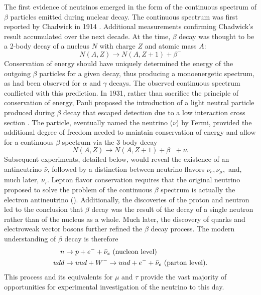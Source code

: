 The first evidence of neutrinos emerged in the form of
the continuous spectrum of $\beta$ particles
emitted during nuclear decay.
The continuous spectrum was first reported by Chadwick in 1914 \cite{chadwick_beta}.
Additional measurements confirming Chadwick's result accumulated over the next decade.
At the time, $\beta$ decay was thought to be a 2-body decay
of a nucleus $N$ with charge $Z$ and atomic mass $A$:
\begin{equation}\label{eq:old_beta}
    N(A, Z) \to N(A, Z+1) + \beta^-
\end{equation}
Conservation of energy should have uniquely determined the energy
of the outgoing $\beta$ particles for a given decay,
thus producing a monoenergetic spectrum,
as had been observed for $\alpha$ and $\gamma$ decays.
The observed continuous spectrum conflicted with this prediction.
In 1931, rather than sacrifice the principle of conservation of energy,
Pauli proposed the introduction of a light neutral particle
produced during $\beta$ decay that escaped detection
due to a low interaction cross section \cite{pauli_letter}.
The particle, eventually named the neutrino ($\nu$) by Fermi,
provided the additional degree of freedom needed
to maintain conservation of energy and allow for a continuous $\beta$ spectrum
via the 3-body decay
\begin{equation}\label{eq:beta_mid}
    N(A, Z) \to N(A, Z+1) + \beta^- + \nu.
\end{equation}
Subsequent experiments, detailed below,
would reveal the existence of an antineutrino $\bar{\nu}$,
followed by a distinction between neutrino flavors $\nu_e, \nu_\mu,$
and, much later, $\nu_\tau$.
Lepton flavor conservation requires that
the original neutrino proposed to solve
the problem of the continuous $\beta$ spectrum
is actually the electron antineutrino (\nuebar).
Additionally, the discoveries of the proton and neutron
led to the conclusion that $\beta$ decay was the result of
the decay of a single neutron rather than of the nucleus as a whole.
Much later, the discovery of quarks and electroweak vector bosons
further refined the $\beta$ decay process.
The modern understanding of $\beta$ decay is therefore
\begin{align}\label{eq:beta_modern}
    \begin{split}
        n &\to p + e^- + \bar{\nu}_e \text{ (nucleon level)} \\
        udd &\to uud + W^- \to uud + e^- + \bar{\nu}_e \text{ (parton level)}.
    \end{split}
\end{align}
This process and its equivalents for $\mu$ and $\tau$
provide the vast majority of opportunities for
experimental investigation of the neutrino to this day.

